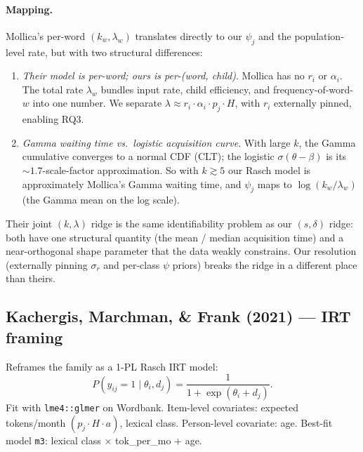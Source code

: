 \documentclass[11pt]{article}
\begin{document}
\paragraph{Mapping.} Mollica's per-word \((k_w, \lambda_w)\) translates
directly to our \(\psi_j\) and the population-level rate, but with
two structural differences:
\begin{enumerate}[leftmargin=1.3em]
\item \emph{Their model is per-word; ours is per-(word, child)}.
Mollica has no \(r_i\) or \(\alpha_i\). The total rate
\(\lambda_w\) bundles input rate, child efficiency, and
frequency-of-word-\(w\) into one number. We separate
\(\lambda \approx r_i \cdot \alpha_i \cdot p_j \cdot H\), with
\(r_i\) externally pinned, enabling RQ3.
\item \emph{Gamma waiting time vs.\ logistic acquisition curve}. With
large \(k\), the Gamma cumulative converges to a normal CDF (CLT);
the logistic \(\sigma(\theta - \beta)\) is its
\(\sim\!1.7\)-scale-factor approximation. So with \(k \gtrsim 5\)
our Rasch model is approximately Mollica's Gamma waiting time, and
\(\psi_j\) maps to \(\log(k_w / \lambda_w)\) (the Gamma mean on the
log scale).
\end{enumerate}
Their joint \((k, \lambda)\) ridge is the same identifiability problem
as our \((s, \delta)\) ridge: both have one structural quantity
(the mean / median acquisition time) and a near-orthogonal shape
parameter that the data weakly constrains. Our resolution
(externally pinning \(\sigma_r\) and per-class \(\psi\) priors)
breaks the ridge in a different place than theirs.

\subsection*{Kachergis, Marchman, \& Frank (2021) — IRT framing}

Reframes the family as a 1-PL Rasch IRT model:
\[
P(y_{ij} = 1 \mid \theta_i, d_j)
= \frac{1}{1 + \exp(\theta_i + d_j)}.
\]
Fit with \texttt{lme4::glmer} on Wordbank. Item-level covariates:
expected tokens/month \((p_j \cdot H \cdot a)\), lexical class.
Person-level covariate: age. Best-fit model \texttt{m3}: lexical
class \(\times\) tok\_per\_mo + age.
\end{document}
